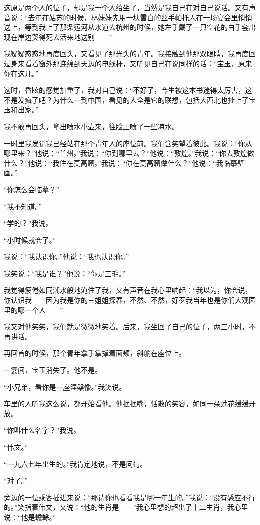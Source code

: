 \par 这原是两个人的位子，却是我一个人给坐了，当然是我自己在对自己说话。又有声音说：“去年在姑苏的时候，林妹妹先用一块雪白的丝手帕托人在一场宴会里悄悄送上，等到我上了那条运河从水道去杭州的时候，她左手戴了一只空花的白手套出现在岸边哭得死去活来地送别——”
\par 我疑疑惑惑地再度回头，又看见了那光头的青年。我接触到他那双眼睛，我再度回过身来看着窗外那连绵到天边的电线杆，又听见自己在说同样的话：“宝玉，原来你在这儿。”
\par 这时，昏眩的感觉加重了，我对自己说：“不好了，今生被这本书迷得太厉害，这不是发疯了吧？为什么一到中国，看见的人全是它的联想，包括大西北也扯上了宝玉和出家。”
\par 我不敢再回头，拿出喷水小壶来，往脸上喷了一些凉水。
\par 一时里我发觉我已经站在那个青年人的座位前。我们含笑望着彼此。我说：“你从哪里来？”他说：“兰州。”我说：“你到哪里去？”他说：“敦煌。”我说：“你去敦煌做什么？”他说：“我住在莫高窟。”我说：“你在莫高窟做什么？”他说：“我临摹壁画。”
\par “你怎么会临摹？”
\par “我不知道。”
\par “学的？”我说。
\par “小时候就会了。”
\par 我说：“我认识你。”他说：“我也认识你。”
\par 我笑说：“我是谁？”他说：“你是三毛。”
\par 我觉得疲倦如同潮水般地淹住了我，又有声音在我心里响起：“我以为，你会说，你认识我——因为我是你的三姐姐探春，不然、不然，好歹我当年也是你们大观园里的哪一个人——”
\par 我又对他笑笑，我们就是微微地笑着。后来，我坐回了自己的位子，两三小时，不再讲话。
\par 再回首的时候，那个青年拿手掌撑着面颊，斜躺在座位上。
\par 一霎间，宝玉消失了。他不是。
\par 
\par “小兄弟，看你是一座涅槃像。”我笑说。
\par 车里的人听我这么说，都开始看他。他抿抿嘴，恬散的笑容，如同一朵莲花缓缓开放。
\par “你叫什么名字？”我说。
\par “伟文。”
\par “一九六七年出生的。”我肯定地说，不是问句。
\par “对了。”
\par 旁边的一位乘客插进来说：“那请你也看看我是哪一年生的。”我说：“没有感应不行的。”笑指着伟文，又说：“他的生肖是——”我心里想的超出了十二生肖，我心里说：“他是蟾蜍。”
